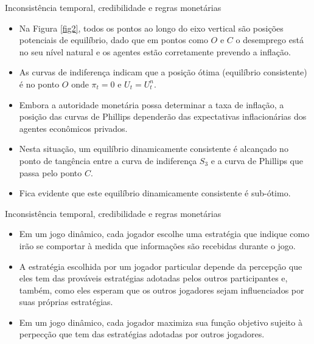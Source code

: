 \documentclass[10pt]{beamer}
\begin{document}
\begin{frame}{Inconsistência temporal, credibilidade e regras monetárias}
    \begin{itemize}
        \item Na Figura \ref{fig2}, todos os pontos ao longo do eixo vertical são posições potenciais de equilíbrio, dado que em pontos como $O$ e $C$ o desemprego está no seu nível natural e os agentes estão corretamente prevendo a inflação.
        \bigskip
        \item As curvas de indiferença indicam que a posição ótima (equilíbrio consistente) é no ponto $O$ onde $\pi_t = 0$ e $U_t = U_t^n$.
        \bigskip
        \item Embora a autoridade monetária possa determinar a taxa de inflação, a posição das curvas de Phillips dependerão das expectativas inflacionárias dos agentes econômicos privados.
        \bigskip
        \item Nesta situação, um equilíbrio dinamicamente consistente é alcançado no ponto de tangência entre a curva de indiferença $S_3$ e a curva de Phillips que passa pelo ponto $C$.
        \bigskip
        \item Fica evidente que este equilíbrio dinamicamente consistente é sub-ótimo.
    \end{itemize}
\end{frame}

\begin{frame}{Inconsistência temporal, credibilidade e regras monetárias}
    \begin{itemize}
        \item Em um jogo dinâmico, cada jogador escolhe uma estratégia que indique como irão se comportar à medida que informações são recebidas durante o jogo.
        \bigskip
        \item A estratégia escolhida por um jogador particular depende da percepção que eles tem das prováveis estratégias adotadas pelos outros participantes e, também, como eles esperam que os outros jogadores sejam influenciados por suas próprias estratégias.
        \bigskip
        \item Em um jogo dinâmico, cada jogador maximiza sua função objetivo sujeito à perpecção que tem das estratégias adotadas por outros jogadores.
    \end{itemize}
\end{frame}
\end{document}
